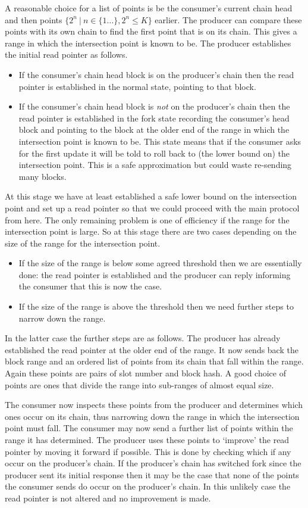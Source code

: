 \documentclass{article}
\theoremstyle{definition}{
  \newtheorem{lemma}{Lemma}[section] %
  \newtheorem{definition}[lemma]{Definition}
}
\theoremstyle{theorem}{
  \newtheorem{invariant}[lemma]{Invariant}
  \newtheorem{proofobligation}[lemma]{Proof Obligation}
}
\numberwithin{equation}{lemma}
\begin{document}
A reasonable choice for a list of points is be the consumer's current chain
head and then points $\{2^n ~ | ~ n \in \{1\ldots\},  2^n \leq K\}$ earlier.
The producer can compare these points with its own chain to find the first
point that is on its chain. This gives a range in which the intersection point
is known to be. The producer establishes the initial read pointer as follows.
\begin{itemize}
\item If the consumer's chain head block is on the producer's chain then the
      read pointer is established in the normal state, pointing to that block.
\item If the consumer's chain head block is \emph{not} on the producer's chain
      then the read pointer is established in the fork state recording the
      consumer's head block and pointing to the block at the older end of the
      range in which the intersection point is known to be. This state means
      that if the consumer asks for the first update it will be told to roll
      back to (the lower bound on) the intersection point. This is a safe
      approximation but could waste re-sending many blocks.
\end{itemize}
At this stage we have at least established a safe lower bound on the
intersection point and set up a read pointer so that we could proceed with the
main protocol from here. The only remaining problem is one of efficiency if
the range for the intersection point is large. So at this stage there are two
cases depending on the size of the range for the intersection point.
\begin{itemize}
\item If the size of the range is below some agreed threshold then we are
      essentially done: the read pointer is established and the producer can
      reply informing the consumer that this is now the case.
\item If the size of the range is above the threshold then we need further
      steps to narrow down the range.
\end{itemize}
In the latter case the further steps are as follows. The producer has already
established the read pointer at the older end of the range. It now sends back
the block range and an ordered list of points from its chain that fall within
the range. Again these points are pairs of slot number and block hash. A good
choice of points are ones that divide the range into sub-ranges of almost equal
size.

The consumer now inspects these points from the producer and determines which
ones occur on its chain, thus narrowing down the range in which the
intersection point must fall. The consumer may now send a further list of
points within the range it has determined. The producer uses these points to
`improve' the read pointer by moving it forward if possible. This is done by
checking which if any occur on the producer's chain. If the producer's chain
has switched fork since the producer sent its initial response then it may be
the case that none of the points the consumer sends do occur on the producer's
chain. In this unlikely case the read pointer is not altered and no improvement
is made.
\end{document}
